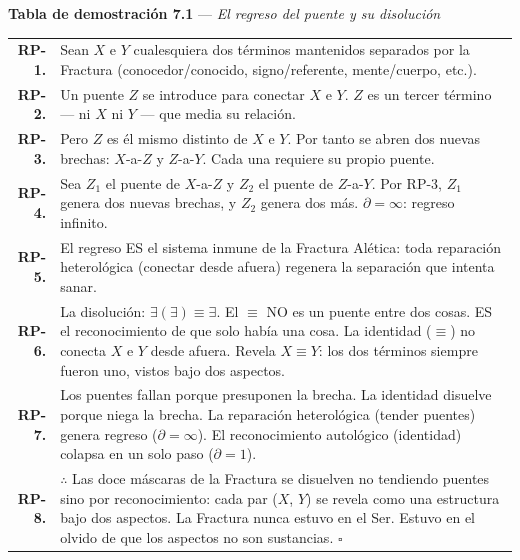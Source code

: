 \documentclass[10pt, openany, oneside]{book}
\renewcommand{\footnotesize}{\fontsize{8.5}{11}\selectfont}
\begin{document}
\vspace{0.5em}

\textbf{Tabla de demostración 7.1} --- \textit{El regreso del puente y su disolución}

\vspace{0.5em}

{\footnotesize
\noindent\begin{tabular}{r p{}}
\textbf{RP-1.} & Sean $X$ e $Y$ cualesquiera dos términos mantenidos separados por la Fractura (conocedor/conocido, signo/referente, mente/cuerpo, etc.). \\[0.3em]
\textbf{RP-2.} & Un puente $Z$ se introduce para conectar $X$ e $Y$. $Z$ es un tercer término --- ni $X$ ni $Y$ --- que media su relación. \\[0.3em]
\textbf{RP-3.} & Pero $Z$ es él mismo distinto de $X$ e $Y$. Por tanto se abren dos nuevas brechas: $X$-a-$Z$ y $Z$-a-$Y$. Cada una requiere su propio puente. \\[0.3em]
\textbf{RP-4.} & Sea $Z_1$ el puente de $X$-a-$Z$ y $Z_2$ el puente de $Z$-a-$Y$. Por RP-3, $Z_1$ genera dos nuevas brechas, y $Z_2$ genera dos más. $\partial = \infty$: regreso infinito. \\[0.3em]
\textbf{RP-5.} & El regreso ES el sistema inmune de la Fractura Alética: toda reparación heterológica (conectar desde afuera) regenera la separación que intenta sanar. \\[0.3em]
\textbf{RP-6.} & La disolución: $\exists(\exists) \equiv \exists$. El $\equiv$ NO es un puente entre dos cosas. ES el reconocimiento de que solo había una cosa. La identidad ($\equiv$) no conecta $X$ e $Y$ desde afuera. Revela $X \equiv Y$: los dos términos siempre fueron uno, vistos bajo dos aspectos. \\[0.3em]
\textbf{RP-7.} & Los puentes fallan porque presuponen la brecha. La identidad disuelve porque niega la brecha. La reparación heterológica (tender puentes) genera regreso ($\partial = \infty$). El reconocimiento autológico (identidad) colapsa en un solo paso ($\partial = 1$). \\[0.3em]
\textbf{RP-8.} & $\therefore$ Las doce máscaras de la Fractura se disuelven no tendiendo puentes sino por reconocimiento: cada par ($X$, $Y$) se revela como una estructura bajo dos aspectos. La Fractura nunca estuvo en el Ser. Estuvo en el olvido de que los aspectos no son sustancias. $\square$ \\[0.3em]
\end{tabular}
}
\end{document}
